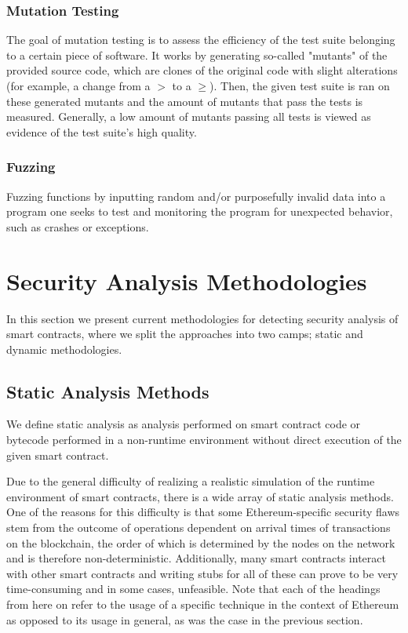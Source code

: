 \documentclass[letterpaper,twocolumn,10pt]{article}
\begin{document}
\subsubsection{Mutation Testing}
\label{subsection:mut}
The goal of mutation testing is to assess the efficiency of the test suite belonging to a certain piece of software. It works by generating so-called "mutants" of the provided source code, which are clones of the original code with slight alterations (for example, a change from a $>$ to a $\geq$). Then, the given test suite is ran on these generated mutants and the amount of mutants that pass the tests is measured. Generally, a low amount of mutants passing all tests is viewed as evidence of the test suite's high quality.

\subsubsection{Fuzzing}
Fuzzing functions by inputting random and/or purposefully invalid data into a program one seeks to test and monitoring the program for unexpected behavior, such as crashes or exceptions.

\section{Security Analysis Methodologies}
In this section we present current methodologies for detecting security analysis of smart contracts, where we split the approaches into two camps; static and dynamic methodologies.


\subsection{Static Analysis Methods}
We define static analysis as analysis performed on smart contract code or bytecode performed in a non-runtime environment without direct execution of the given smart contract.


Due to the general difficulty of realizing a realistic simulation of the runtime environment of smart contracts, there is a wide array of static analysis methods. One of the reasons for this difficulty is that some Ethereum-specific security flaws stem from the outcome of operations dependent on arrival times of transactions on the blockchain, the order of which is determined by the nodes on the network and is therefore non-deterministic. Additionally, many smart contracts interact with other smart contracts and writing stubs for all of these can prove to be very time-consuming and in some cases, unfeasible. Note that each of the headings from here on refer to the usage of a specific technique in the context of Ethereum as opposed to its usage in general, as was the case in the previous section.
\end{document}
